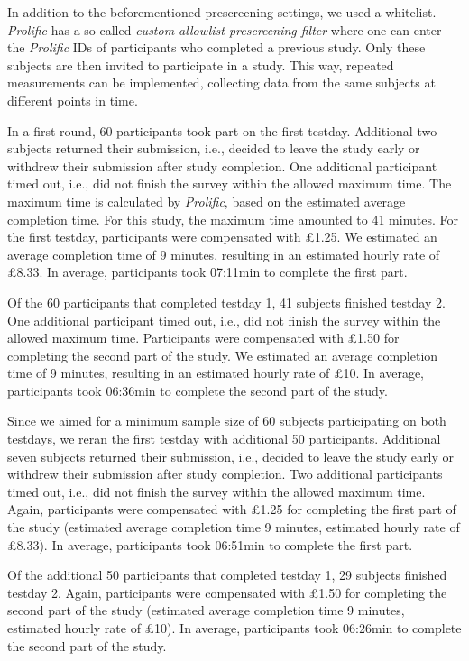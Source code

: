 \documentclass[
  english,
  man,floatsintext]{apa6}
\begin{document}
In addition to the beforementioned prescreening settings, we used a whitelist. \emph{Prolific} has a so-called \emph{custom allowlist prescreening filter} where one can enter the \emph{Prolific} IDs of participants who completed a previous study. Only these subjects are then invited to participate in a study. This way, repeated measurements can be implemented, collecting data from the same subjects at different points in time.

In a first round, 60 participants took part on the first testday. Additional two subjects returned their submission, i.e., decided to leave the study early or withdrew their submission after study completion. One additional participant timed out, i.e., did not finish the survey within the allowed maximum time. The maximum time is calculated by \emph{Prolific}, based on the estimated average completion time. For this study, the maximum time amounted to 41 minutes. For the first testday, participants were compensated with £1.25. We estimated an average completion time of 9 minutes, resulting in an estimated hourly rate of £8.33. In average, participants took 07:11min to complete the first part.

Of the 60 participants that completed testday 1, 41 subjects finished testday 2. One additional participant timed out, i.e., did not finish the survey within the allowed maximum time. Participants were compensated with £1.50 for completing the second part of the study. We estimated an average completion time of 9 minutes, resulting in an estimated hourly rate of £10. In average, participants took 06:36min to complete the second part of the study.

Since we aimed for a minimum sample size of 60 subjects participating on both testdays, we reran the first testday with additional 50 participants. Additional seven subjects returned their submission, i.e., decided to leave the study early or withdrew their submission after study completion. Two additional participants timed out, i.e., did not finish the survey within the allowed maximum time. Again, participants were compensated with £1.25 for completing the first part of the study (estimated average completion time 9 minutes, estimated hourly rate of £8.33). In average, participants took 06:51min to complete the first part.

Of the additional 50 participants that completed testday 1, 29 subjects finished testday 2. Again, participants were compensated with £1.50 for completing the second part of the study (estimated average completion time 9 minutes, estimated hourly rate of £10). In average, participants took 06:26min to complete the second part of the study.
\end{document}
